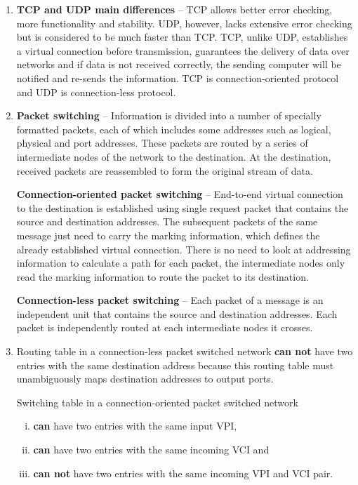 \documentclass[a4paper, 11pt]{article}
\begin{document}
\begin{enumerate}
		\item %
			\textbf{TCP and UDP main differences} -- TCP allows better error checking, more functionality and stability.
			UDP, however, lacks extensive error checking but is considered to be much faster than TCP.
			TCP, unlike UDP, establishes a virtual connection before transmission, guarantees the delivery of data over
			networks and if data is not received correctly, the sending computer will be notified and re-sends the
			information. TCP is connection-oriented protocol and UDP is connection-less protocol.

		\item %
			\textbf{Packet switching} -- Information is divided into a number of specially formatted packets, each of
			which includes some addresses such as logical, physical and port addresses. These packets are routed by a
			series of intermediate nodes of the network to the destination. At the destination, received packets are
			reassembled to form the original stream of data.

			\textbf{Connection-oriented packet switching} -- End-to-end virtual connection to the destination is
			established using single request packet that contains the source and destination addresses. The subsequent
			packets of the same message just need to carry the marking information, which defines the already established
			virtual connection. There is no need to look at addressing information to calculate a path for each packet,
			the intermediate nodes only read the marking information to route the packet to its destination.

			\textbf{Connection-less packet switching} -- Each packet of a message is an independent unit that contains the
			source and destination addresses. Each packet is independently routed at each intermediate nodes it crosses.

		\item %
			Routing table in a connection-less packet switched network \textbf{can not} have two entries with the same destination
			address because this routing table must unambiguously maps destination addresses to output ports.

			Switching table in a connection-oriented packet switched network
			\begin{enumerate}[i)]
				\item \textbf{can} have two entries with the same input VPI, %
				\item \textbf{can} have two entries with the same incoming VCI and %
				\item \textbf{can not} have two entries with the same incoming VPI and VCI pair. %
			\end{enumerate}


\end{enumerate}
\end{document}
